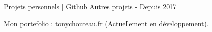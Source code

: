 \begin{cventries}
  \cventry
    {Projets personnels | \href{https://github.com/TonyChouteau?tab=repositories}{\faGithubSquare\acvHeaderIconSep Github}%
    } %
    {Autres projets} %
    {-} %
    {Depuis 2017} %
    {
      \begin{cvitems} %
        \item {Mon portefolio : \underline{\href{https://www.tonychouteau.fr}{tonychouteau.fr}} (Actuellement en développement).}
      \end{cvitems}
    }
\end{cventries}
